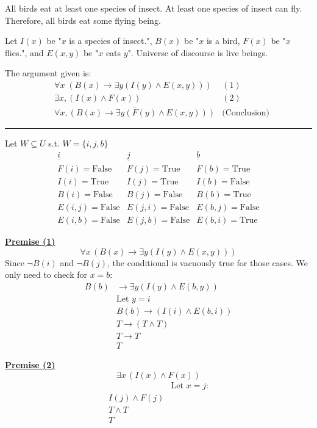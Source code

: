 \documentclass[]{article}
\begin{document}
\begin{question}{1.4}
All birds eat at least one species of insect. At least one species of insect can fly. Therefore, all birds
eat some flying being.

Let $I(x)$ be "$x$ is a species of insect.", $B(x)$ be "$x$ is a bird, $F(x)$ be "$x$ flies.", and $E(x,y)$ be "$x$ eats $y$". Universe of discourse is live beings.
\end{question}

The argument given is:
\begin{align*}
    & \forall x\;(B(x) \rightarrow \exists y(I(y) \land E(x, y))) & (1)\\
    & \exists x, (I(x) \land F(x)) & (2)\\
    & \overline{\forall x, (B(x) \rightarrow \exists y(F(y) \land E(x, y)))} & \text{(Conclusion)}
\end{align*}
\hrule
\vspace{0.1in}
Let $W \subseteq U$ s.t. $W = \{i, j, b\}$
\[
\begin{array}{c|c|c}
    \underline{i} & \underline{j} & \underline{b} \\ \hline
    F(i) = \text{False} & F(j) = \text{True} & F(b) = \text{True} \\
    I(i) = \text{True} & I(j) = \text{True} & I(b) = \text{False} \\
    B(i) = \text{False} & B(j) = \text{False} & B(b) = \text{True} \\
    E(i, j) = \text{False} & E(j, i) = \text{False} & E(b, j) = \text{False} \\
    E(i, b) = \text{False} & E(j, b) = \text{False} & E(b, i) = \text{True}
\end{array}
\]

\underline{\textbf{Premise (1)}}  
\[
\forall x\,(B(x) \rightarrow \exists y(I(y) \land E(x, y)))
\]
Since $\neg B(i)$ and $\neg B(j)$, the conditional is vacuously true for those cases.  
We only need to check for $x = b$:
\begin{align*}
    B(b) &\rightarrow \exists y(I(y) \land E(b, y)) \\
    &\text{Let } y = i \\
    &B(b) \rightarrow (I(i) \land E(b, i)) \\
    &T \rightarrow (T \land T) \\
    &T \rightarrow T \\
    &T
\end{align*}


\underline{\textbf{Premise (2)}}  
\[
\exists x\,(I(x) \land F(x))
\]
\begin{align*}
    &\text{Let $x = j$:} \\
    I(j) \land F(j) \\
    T \land T \\
    T
\end{align*}
\end{document}
